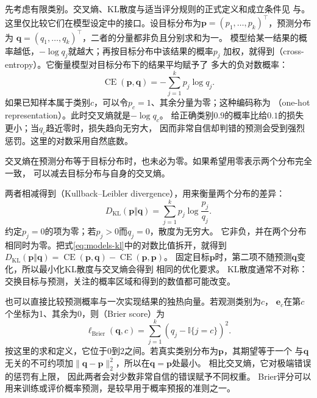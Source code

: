先考虑有限类别。交叉熵、KL散度与适当评分规则的正式定义和成立条件见
与。
这里仅比较它们在模型设定中的接口。设目标分布为$\bm{p}=(p_1,\ldots,p_k)^{\top}$，预测分布为
$\bm{q}=(q_1,\ldots,q_k)^{\top}$，二者的分量都非负且分别求和为一。
模型给某一结果的概率越低，$-\log q_j$就越大；再按目标分布中该结果的概率$p_j$
加权，就得到（cross-entropy）。它衡量模型对目标分布下的结果平均赋予了
多大的负对数概率：
\begin{equation}
  \operatorname{CE}(\bm{p},\bm{q})=-\sum_{j=1}^{k}p_j\log q_j.
  \label{eq:models-cross-entropy}
\end{equation}
如果已知样本属于类别$c$，可以令$p_c=1$、其余分量为零；这种编码称为
（one-hot representation）。此时交叉熵就是$-\log q_c$。
给正确类别$0.9$的概率比给$0.1$的损失更小；当$q_c$趋近零时，损失趋向无穷大，
因而非常自信却判错的预测会受到强烈惩罚。这里的对数采用自然底数。

交叉熵在预测分布等于目标分布时，也未必为零。如果希望用零表示两个分布完全一致，
可以减去目标分布与自身的交叉熵。

两者相减得到（Kullback--Leibler divergence），用来衡量两个分布的差异：
\begin{equation}
  D_{\mathrm{KL}}(\bm{p}\Vert\bm{q})
  =\sum_{j=1}^{k}p_j\log\frac{p_j}{q_j}.
  \label{eq:models-kl}
\end{equation}
约定$p_j=0$的项为零；若$p_j>0$而$q_j=0$，散度为无穷大。
它非负，并在两个分布相同时为零。把式\eqref{eq:models-kl}中的对数比值拆开，就得到
$D_{\mathrm{KL}}(\bm{p}\Vert\bm{q})
=\operatorname{CE}(\bm{p},\bm{q})-\operatorname{CE}(\bm{p},\bm{p})$。
固定目标$\bm{p}$时，第二项不随预测$\bm{q}$变化，所以最小化KL散度与交叉熵会得到
相同的优化要求。
KL散度通常不对称：交换目标与预测，关注的概率区域和得到的数值都可能改变。

也可以直接比较预测概率与一次实现结果的独热向量。若观测类别为$c$，
$\bm e_c$在第$c$个坐标为1、其余为0，则（Brier score）为
\begin{equation}
  \ell_{\mathrm{Brier}}(\bm{q},c)
  =\sum_{j=1}^{k}(q_j-\mathbb I\{j=c\})^2.
  \label{eq:models-brier}
\end{equation}
按这里的求和定义，它位于$0$到$2$之间。若真实类别分布为$\bm p$，其期望等于一个
与$\bm q$无关的不可约项加$\|\bm q-\bm p\|_2^2$，所以在$\bm q=\bm p$处最小。
相比交叉熵，它对极端错误的惩罚有上限，
因此两者会对少数非常自信的错误赋予不同权重。
Brier评分可以用来训练或评价概率预测，是较早用于概率预报的准则之一。

